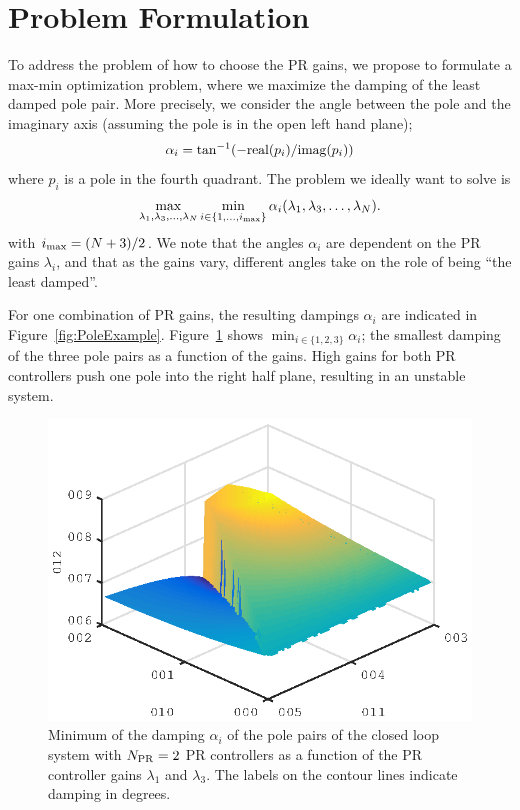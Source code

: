 \documentclass[conference,10pt]{IEEEtran}
\begin{document}
\section{Problem Formulation}
To address the problem of how to choose the PR gains, we propose to formulate a max-min optimization problem, where we maximize the damping of the least damped pole pair. More precisely, we consider the angle between the pole and the imaginary axis (assuming the pole is in the open left hand plane);
\begin{align*}
\alpha_i = \tan^{-1}(-{\rm real}(p_i) / {\rm imag}(p_i))
\end{align*}
where $p_i$ is a pole in the fourth quadrant. The problem we ideally want to solve is
\begin{align}
\label{eq:MaxMinProb}
\max_{\lambda_1,\lambda_3,\dots, \lambda_N}\min_{i\in \{1, \dots, i_{\rm max}\}} \alpha_i(\lambda_1,\lambda_3,\dots, \lambda_N).
\end{align}
with $i_{\rm max} = (N+3)/2$. We note that the angles $\alpha_i$ are dependent on the PR gains $\lambda_i$, and that as the gains vary, different angles take on the role of being ``the least damped''.

For one combination of PR gains, the resulting dampings $\alpha_i$ are indicated in Figure~\ref{fig:PoleExample}. Figure~\ref{fig:DampingExample} shows $\min_{i\in\{1,2,3\}}\alpha_i$; the smallest damping of the three pole pairs as a function of the gains. High gains for both PR controllers push one pole into the right half plane, resulting in an unstable system.
\begin{figure}[!h]
\centering

\includegraphics{fig/root_locus_2D_in_3D}
\caption{Minimum of the damping $\alpha_i$ of the pole pairs of the closed loop system with $N_{\rm PR}=2$ PR controllers as a function of the PR controller gains $\lambda_1$ and $\lambda_3$. The labels on the contour lines indicate damping in degrees.}
\label{fig:DampingExample}
\end{figure}
\end{document}
